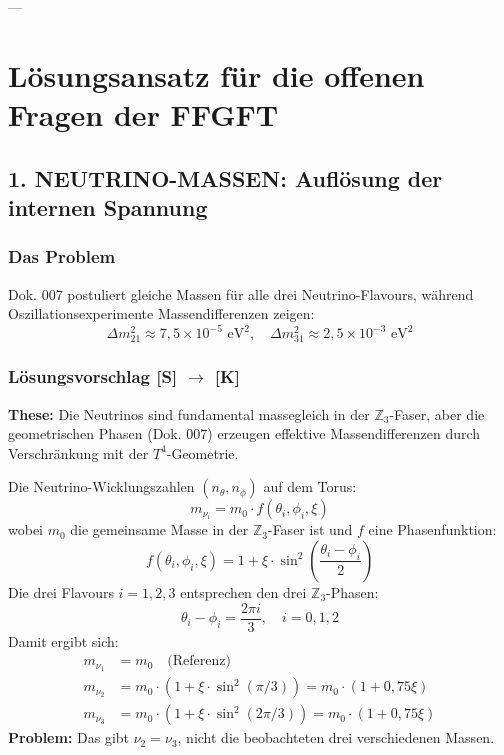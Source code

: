 \documentclass[11pt,a4paper]{article}
\begin{document}
	---
	
	\section{Lösungsansatz für die offenen Fragen der FFGFT}
	
	\subsection{1. NEUTRINO-MASSEN: Auflösung der internen Spannung}
	\subsubsection{Das Problem}
	Dok. 007 postuliert gleiche Massen für alle drei Neutrino-Flavours, während Oszillationsexperimente Massendifferenzen zeigen:
	\begin{equation}
		\Delta m_{21}^2 \approx 7{,}5 \times 10^{-5}\text{ eV}^2, \quad \Delta m_{31}^2 \approx 2{,}5 \times 10^{-3}\text{ eV}^2
	\end{equation}
	
	\subsubsection{Lösungsvorschlag [S] \texorpdfstring{$\rightarrow$}{->} [K]}
	\textbf{These:} Die Neutrinos sind fundamental massegleich in der $\mathbb{Z}_3$-Faser, aber die geometrischen Phasen (Dok. 007) erzeugen effektive Massendifferenzen durch Verschränkung mit der $T^4$-Geometrie.
	
	Die Neutrino-Wicklungszahlen $(n_\theta, n_\phi)$ auf dem Torus:
	\begin{equation}
		m_{\nu_i} = m_0 \cdot f(\theta_i, \phi_i, \xi)
	\end{equation}
	wobei $m_0$ die gemeinsame Masse in der $\mathbb{Z}_3$-Faser ist und $f$ eine Phasenfunktion:
	\begin{equation}
		f(\theta_i, \phi_i, \xi) = 1 + \xi \cdot \sin^2\left(\frac{\theta_i - \phi_i}{2}\right)
	\end{equation}
	Die drei Flavours $i=1,2,3$ entsprechen den drei $\mathbb{Z}_3$-Phasen:
	\begin{equation}
		\theta_i - \phi_i = \frac{2\pi i}{3}, \quad i = 0,1,2
	\end{equation}
	Damit ergibt sich:
	\begin{align}
		m_{\nu_1} &= m_0 \quad \text{(Referenz)} \\
		m_{\nu_2} &= m_0 \cdot (1 + \xi \cdot \sin^2(\pi/3)) = m_0 \cdot (1 + 0{,}75\xi) \\
		m_{\nu_3} &= m_0 \cdot (1 + \xi \cdot \sin^2(2\pi/3)) = m_0 \cdot (1 + 0{,}75\xi)
	\end{align}
	\textbf{Problem:} Das gibt $\nu_2 = \nu_3$, nicht die beobachteten drei verschiedenen Massen.
	
\end{document}
